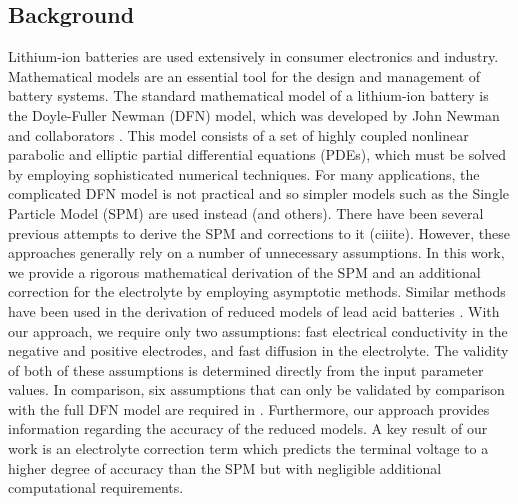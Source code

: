 \documentclass[preprint]{elsarticle}
\begin{document}
\subsection{Background}
Lithium-ion batteries are used extensively in consumer electronics and industry. Mathematical models are an essential tool for the design and management of battery systems. The standard mathematical model of a lithium-ion battery is the Doyle-Fuller Newman (DFN) model, which was developed by John Newman and collaborators \cite{doyle,Fuller1994,newman_book}. This model consists of a set of highly coupled nonlinear parabolic and elliptic partial differential equations (PDEs), which must be solved by employing sophisticated numerical techniques. For many applications, the complicated DFN model is not practical and so  simpler models such as the Single Particle Model (SPM) are used instead \cite{Moura2017} (and others). There have been several previous attempts to derive the SPM and corrections to it (ciiite). However, these approaches generally rely on a number of unnecessary assumptions. In this work, we provide a rigorous mathematical derivation of the SPM and an additional correction for the electrolyte by employing asymptotic methods. Similar methods have been used in the derivation of reduced models of lead acid batteries \cite{tino}. With our approach, we require only two assumptions: fast electrical conductivity in the negative and positive electrodes, and fast diffusion in the electrolyte. The validity of both of these assumptions is determined directly from the input parameter values. In comparison, six assumptions that can only be validated by comparison with the full DFN model are required in \cite{Moura2017}. Furthermore, our approach provides information regarding the accuracy of the reduced models. A key result of our work is an electrolyte correction term which predicts the terminal voltage to a higher degree of accuracy than the SPM but with negligible additional computational requirements. 
\end{document}
